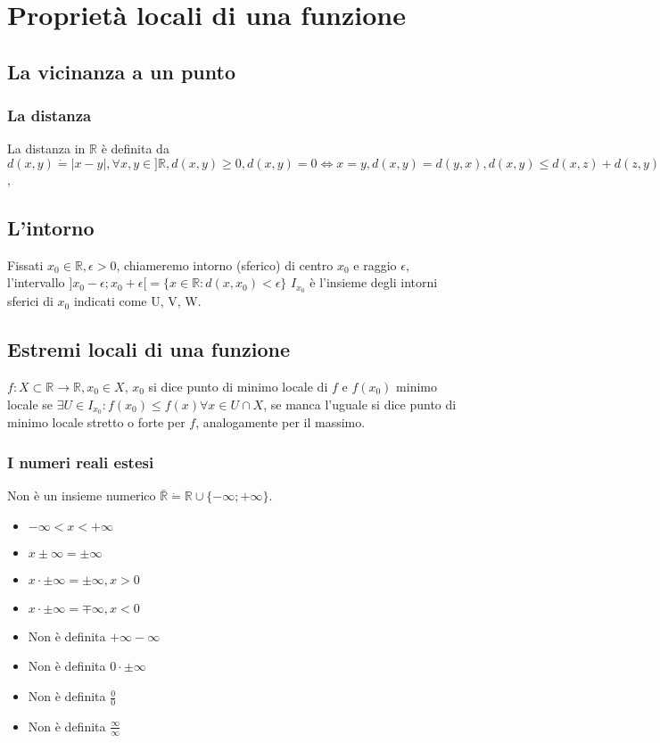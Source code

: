 \chapter{Propriet\`a locali di una funzione}
\section{La vicinanza a un punto}
\subsection{La distanza}

La distanza in $\mathbb{R}$ \`e definita da $d(x, y)\dot{=}|x-y|,\forall x,y\in]\mathbb{R}, d(x, y)\ge 0, d(x,y)=0\Leftrightarrow x=y, d(x, y)=d(y, x), d(x, y)\le d(x,z)
+d(z,y)$, 
\section{L'intorno}
Fissati $x_0\in\mathbb{R}, \epsilon>0$, chiameremo intorno (sferico) di centro $x_0$ e raggio $\epsilon$, l'intervallo $]x_0-\epsilon; x_0+\epsilon[=\{x\in\mathbb{R}:d(x, x_0)<\epsilon\}$ $I_{x_0}$ \`e l'insieme degli intorni sferici di $x_0$ indicati come U, V, W.
\section{Estremi locali di una funzione}
$f:X\subset\mathbb{R}\rightarrow\mathbb{R},x_0\in X$, $x_0$ si dice punto di minimo locale di $f$ e $f(x_0)$ minimo locale se $\exists U\in I_{x_0}: f(x_0)\le f(x) \forall x\in U\cap X$, se manca l'uguale si dice punto di minimo locale stretto o forte per $f$, analogamente per il massimo.
\subsection{I numeri reali estesi}
Non \`e un insieme numerico $\bar{\mathbb{R}}\dot{=}\mathbb{R}\cup\{-\infty;+\infty\}$. 
\begin{itemize}
\item $-\infty<x<+\infty$
\item $x\pm\infty=\pm\infty$
\item $x\cdot \pm\infty=\pm\infty, x>0$ 
\item $x\cdot \pm\infty=\mp\infty, x<0$
\item Non \`e definita $+\infty-\infty$
\item Non \`e definita $0\cdot\pm\infty$
\item Non \`e definita $\frac{0}{0}$
\item Non \`e definita $\frac{\infty}{\infty}$
\end{itemize}
